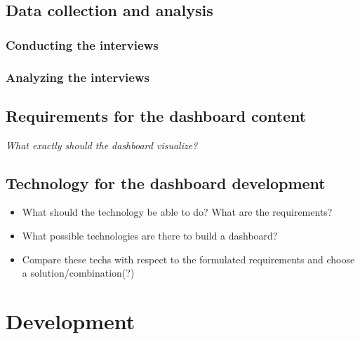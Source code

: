 \subsection{Data collection and analysis}
\subsubsection{Conducting the interviews}

\subsubsection{Analyzing the interviews}

\subsection{Requirements for the dashboard content}
\textit{What exactly should the dashboard visualize?}

\subsection{Technology for the dashboard development} \label{subsec:Technology}
\begin{itemize}
    \item What should the technology be able to do? What are the requirements?
    \item What possible technologies are there to build a dashboard?
    \item Compare these techs with respect to the formulated requirements and choose a solution/combination(?)
\end{itemize}

\section{Development}